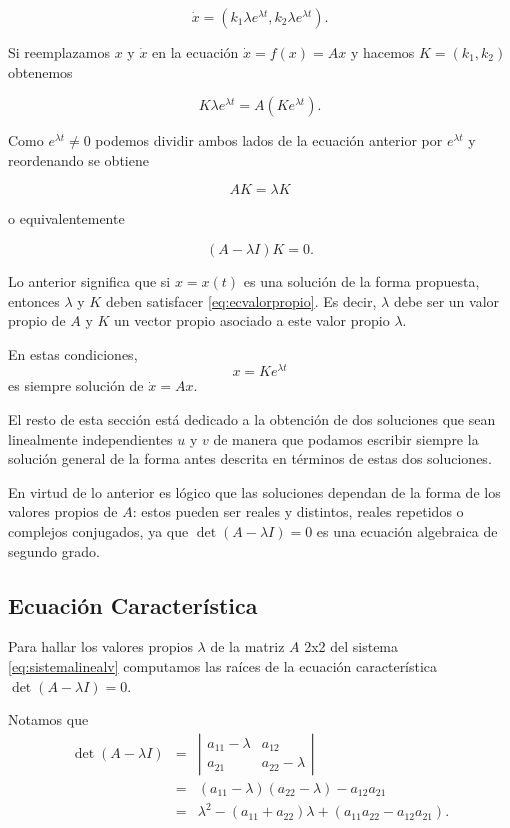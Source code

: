 \documentclass[11pt]{book}
\theoremstyle{definition}
\numberwithin{definition}{section}
\theoremstyle{theorem}
\numberwithin{theorem}{section}
\numberwithin{lemma}{section}
\numberwithin{corollary}{section}
\theoremstyle{plain}
\numberwithin{example}{section}
\begin{document}
$$ \dot{x} = (k_1 \lambda e^{\lambda t}, k_2 \lambda e^{\lambda t}). $$

Si reemplazamos $x$ y $\dot{x}$ en la ecuación $\dot{x} = f(x) = Ax$ y hacemos $K = (k_1, k_2)$ obtenemos

$$
	K \lambda e^{\lambda t} = A (Ke^{\lambda t}).
$$

Como $e^{\lambda t} \neq 0$ podemos dividir ambos lados de la ecuación anterior por $e^{\lambda t}$ y reordenando se obtiene

$$ AK = \lambda K$$

o equivalentemente

\begin{equation} \label{eq:ecvalorpropio}
	(A - \lambda I) K = 0.
\end{equation}

Lo anterior significa que si $x = x(t)$ es una solución de la forma propuesta, entonces $\lambda$ y $K$ deben satisfacer \ref{eq:ecvalorpropio}. Es decir, $\lambda$ debe ser un valor propio de $A$ y $K$ un vector propio asociado a este valor propio $\lambda$.

En estas condiciones, $$ x = K e^{\lambda t}$$ es siempre solución de $\dot{x} = Ax$.

El resto de esta sección está dedicado a la obtención de dos soluciones que sean linealmente independientes $u$ y $v$ de manera que podamos escribir siempre la solución general de la forma antes descrita en términos de estas dos soluciones.

En virtud de lo anterior es lógico que las soluciones dependan de la forma de los valores propios de $A$: estos pueden ser reales y distintos, reales repetidos o complejos conjugados, ya que $\det(A - \lambda I) = 0$ es una ecuación algebraica de segundo grado.

\subsection{Ecuación Característica}

Para hallar los valores propios $\lambda$ de la matriz $A$ 2x2 del sistema \ref{eq:sistemalinealv} computamos las raíces de la ecuación característica $\det(A - \lambda I) = 0$.

Notamos que
\begin{eqnarray*}
	\det(A - \lambda I) & = &  \left| \begin{array}{ll} a_{11} - \lambda & a_{12} \\ a_{21} & a_{22} - \lambda \end{array} \right| \\ 
	& = & (a_{11} - \lambda)(a_{22} - \lambda) - a_{12}a_{21} \\
	& = & \lambda^2 - (a_{11} + a_{22})\lambda + (a_{11}a_{22} - a_{12}a_{21}).
\end{eqnarray*}
\end{document}
